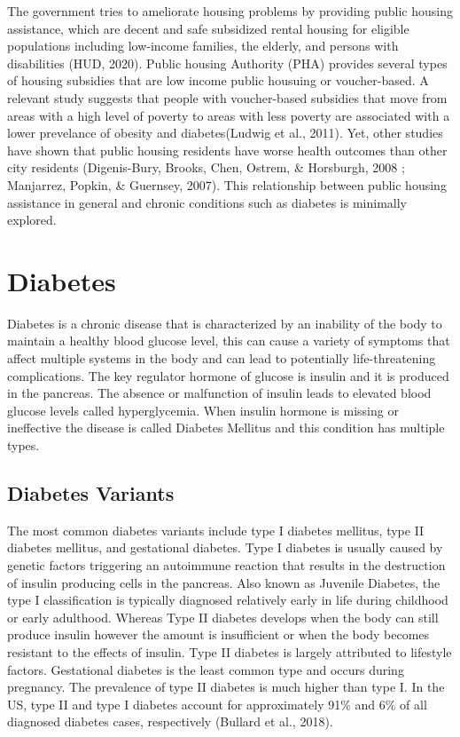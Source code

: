 \documentclass [11pt, proquest] {uwthesis}[2015/03/03]
\begin{document}
The government tries to ameliorate housing problems by providing public
housing assistance, which are decent and safe subsidized rental housing
for eligible populations including low-income families, the elderly, and
persons with disabilities (HUD, 2020). Public housing Authority (PHA)
provides several types of housing subsidies that are low income public
housuing or voucher-based. A relevant study suggests that people with
voucher-based subsidies that move from areas with a high level of
poverty to areas with less poverty are associated with a lower
prevelance of obesity and diabetes(Ludwig et al., 2011). Yet, other
studies have shown that public housing residents have worse health
outcomes than other city residents (Digenis-Bury, Brooks, Chen, Ostrem,
\& Horsburgh, 2008 ; Manjarrez, Popkin, \& Guernsey, 2007). This
relationship between public housing assistance in general and chronic
conditions such as diabetes is minimally explored.

\section{Diabetes}\label{diabetes}

Diabetes is a chronic disease that is characterized by an inability of
the body to maintain a healthy blood glucose level, this can cause a
variety of symptoms that affect multiple systems in the body and can
lead to potentially life-threatening complications. The key regulator
hormone of glucose is insulin and it is produced in the pancreas. The
absence or malfunction of insulin leads to elevated blood glucose levels
called hyperglycemia. When insulin hormone is missing or ineffective the
disease is called Diabetes Mellitus and this condition has multiple
types.

\subsection{Diabetes Variants}\label{diabetes-variants}

The most common diabetes variants include type I diabetes mellitus, type
II diabetes mellitus, and gestational diabetes. Type I diabetes is
usually caused by genetic factors triggering an autoimmune reaction that
results in the destruction of insulin producing cells in the pancreas.
Also known as Juvenile Diabetes, the type I classification is typically
diagnosed relatively early in life during childhood or early adulthood.
Whereas Type II diabetes develops when the body can still produce
insulin however the amount is insufficient or when the body becomes
resistant to the effects of insulin. Type II diabetes is largely
attributed to lifestyle factors. Gestational diabetes is the least
common type and occurs during pregnancy. The prevalence of type II
diabetes is much higher than type I. In the US, type II and type I
diabetes account for approximately 91\% and 6\% of all diagnosed
diabetes cases, respectively (Bullard et al., 2018).
\end{document}
